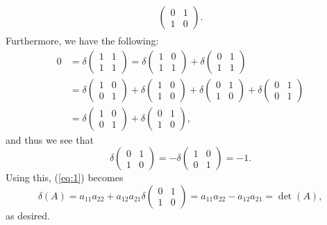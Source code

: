 \documentclass[12pt]{article}
\begin{document}
\begin{enumerate}
\begin{align}
\begin{split}
\begin{pmatrix}
0 & 1 \\
1 & 0
\end{pmatrix}.
\end{split}
\end{align}
Furthermore, we have the following:
\begin{align*}
0 &= \delta \begin{pmatrix}
1 & 1 \\
1 & 1
\end{pmatrix}
= \delta \begin{pmatrix}
1 & 0 \\
1 & 1
\end{pmatrix}
+ \delta \begin{pmatrix}
0 & 1 \\
1 & 1
\end{pmatrix} \\
&= \delta \begin{pmatrix}
1 & 0 \\
0 & 1
\end{pmatrix}
+ \delta \begin{pmatrix}
1 & 0 \\
1 & 0
\end{pmatrix}
+ \delta \begin{pmatrix}
0 & 1 \\
1 & 0
\end{pmatrix}
+ \delta \begin{pmatrix}
0 & 1 \\
0 & 1
\end{pmatrix} \\
&= \delta \begin{pmatrix}
1 & 0 \\
0 & 1
\end{pmatrix}
+ \delta \begin{pmatrix}
0 & 1 \\
1 & 0
\end{pmatrix},
\end{align*}
and thus we see that
\begin{equation*}
\delta \begin{pmatrix}
0 & 1 \\
1 & 0
\end{pmatrix}
= -\delta \begin{pmatrix}
1 & 0 \\
0 & 1
\end{pmatrix}
= -1.
\end{equation*}
Using this, (\ref{eq:1}) becomes
\begin{equation*}
\delta(A) = a_{11}a_{22} + a_{12}a_{21} \delta \begin{pmatrix}
0 & 1 \\
1 & 0
\end{pmatrix}
= a_{11}a_{22} - a_{12}a_{21} = \det(A),
\end{equation*}
as desired.

\end{enumerate}
\end{document}

